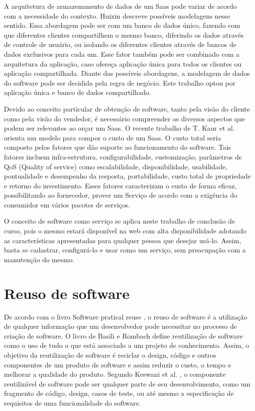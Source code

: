 A arquitetura de armazenamento de dados de um Saas pode variar de acordo com a necessidade do contexto. Huixin \cite{7586486} descreve possíveis modelagens nesse sentido. Essa abordagem pode ser com um banco de dados único, fazendo com que diferentes clientes compartilhem o mesmo banco, diferindo os dados através de controle de usuário, ou isolando os diferentes clientes através de bancos de dados exclusivos para cada um. Esse fator também pode ser combinado com a arquitetura da aplicação, caso ofereça aplicação única para todos os clientes ou aplicação compartilhada. Diante das possíveis abordagens, a modelagem de dados do software pode ser decidida pela regra de negócio. Este trabalho optou por aplicação única e banco de dados compartilhado.

Devido ao conceito particular de obtenção de software, tanto pela visão do cliente como pela visão do vendedor, é necessário compreender os diversos aspectos que podem ser relevantes ao orçar um Saas. O recente trabalho de T. Kaur et al. \citep{6949281} orienta um modelo para compor o custo de um Saas. O custo total seria composto pelos fatores que dão suporte ao funcionamento do software. Tais fatores incluem infra-estrutura, configurabilidade, customização, parâmetros de QoS (Quality of service) como escalabilidade, disponibilidade, usabilidade, pontualidade e desempenho da resposta, portabilidade, custo total de propriedade e retorno do investimento. Esses fatores caracterizam o custo de forma eficaz, possibilitando ao fornecedor, prover um Serviço de acordo com a exigência do consumidor em vários pacotes de serviços.


O conceito de software como serviço se aplica neste trabalho de conclusão de curso, pois o mesmo estará disponível na web com alta disponibilidade adotando as características apresentadas para qualquer pessoa que desejar usá-lo. Assim, basta se cadastrar, configurá-lo e usar como um serviço, sem preocupação com a manutenção do mesmo.


\section{Reuso de software}\label{sec:reuso} %


De acordo com o livro Software pratical reuse \citep{Ezran2002}, o reuso de software é a utilização de qualquer informação que um desenvolvedor pode necessitar no processo de criação de software. O livro de Basili e Rombach \citep{Basili1991} define reutilização de software como o uso de tudo o que está associado a um projeto de conhecimento.
Assim, o objetivo da reutilização de software é reciclar o design, código e outros componentes de um produto de software e assim reduzir o custo, o tempo e melhorar a qualidade do produto.
Segundo Keswani et al. \cite{6783445}, o componente reutilizável de software pode ser qualquer parte de seu desenvolvimento, como um fragmento de código, design, casos de teste, ou até mesmo a especificação de requisitos de uma funcionalidade do software. 

